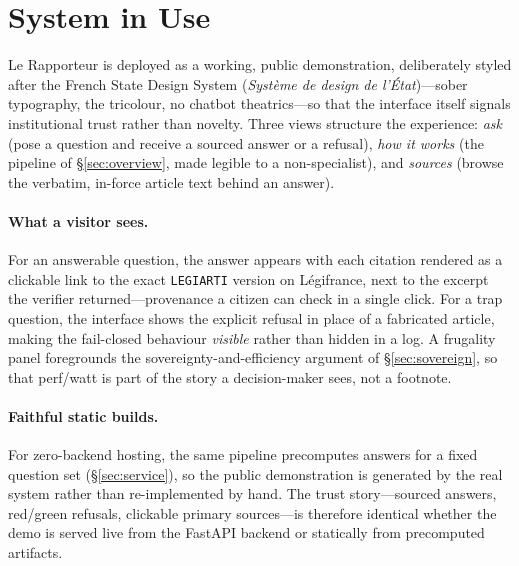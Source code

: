 \section{System in Use}
\label{sec:demo}

Le Rapporteur is deployed as a working, public demonstration, deliberately
styled after the French State Design System (\emph{Syst\`eme de design de
l'\'Etat})---sober typography, the tricolour, no chatbot theatrics---so that the
interface itself signals institutional trust rather than novelty. Three views
structure the experience: \emph{ask} (pose a question and receive a sourced
answer or a refusal), \emph{how it works} (the pipeline of
\S\ref{sec:overview}, made legible to a non-specialist), and \emph{sources}
(browse the verbatim, in-force article text behind an answer).

\paragraph{What a visitor sees.}
For an answerable question, the answer appears with each citation rendered as a
clickable link to the exact \texttt{LEGIARTI} version on L\'egifrance, next to
the excerpt the verifier returned---provenance a citizen can check in a single
click. For a trap question, the interface shows the explicit refusal in place
of a fabricated article, making the fail-closed behaviour \emph{visible} rather
than hidden in a log. A frugality panel foregrounds the
sovereignty-and-efficiency argument of \S\ref{sec:sovereign}, so that
perf/watt is part of the story a decision-maker sees, not a footnote.

\paragraph{Faithful static builds.}
For zero-backend hosting, the same pipeline precomputes answers for a fixed
question set (\S\ref{sec:service}), so the public demonstration is generated by
the real system rather than re-implemented by hand. The trust
story---sourced answers, red/green refusals, clickable primary sources---is
therefore identical whether the demo is served live from the FastAPI backend or
statically from precomputed artifacts.
